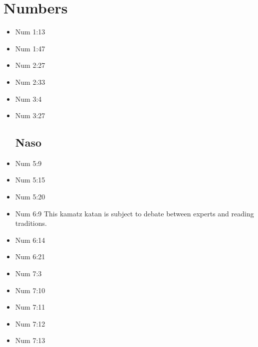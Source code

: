 \documentclass[14pt]{book}
\begin{document}
\section{Numbers}
\begin{multicols}{2}\begin{itemize}
\item Num 1:13

\item Num 1:47

\item Num 2:27

\item Num 2:33

\item Num 3:4

\item Num 3:27

\subsection{Naso}

\item Num 5:9

\item Num 5:15

\item Num 5:20

\item Num 6:9 This kamatz katan is subject to debate between experts and reading traditions.

\item Num 6:14

\item Num 6:21

\item Num 7:3

\item Num 7:10

\item Num 7:11

\item Num 7:12

\item Num 7:13


\end{itemize}
\end{multicols}
\end{document}
